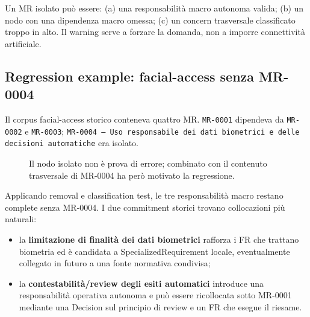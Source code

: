 \documentclass[12pt,a4paper,oneside]{report}
\begin{document}
\begin{resultnote}
Un MR isolato può essere: (a) una responsabilità macro autonoma valida; (b) un nodo con una dipendenza macro omessa; (c) un concern trasversale classificato troppo in alto. Il warning serve a forzare la domanda, non a imporre connettività artificiale.
\end{resultnote}

\subsection{Regression example: facial-access senza MR-0004}

Il corpus facial-access storico conteneva quattro MR. \texttt{MR-0001} dipendeva da \texttt{MR-0002} e \texttt{MR-0003}; \texttt{MR-0004 -- Uso responsabile dei dati biometrici e delle decisioni automatiche} era isolato.

\begin{figure}[H]
\centering
{}
\caption{Il nodo isolato non è prova di errore; combinato con il contenuto trasversale di MR-0004 ha però motivato la regressione.}
\end{figure}

Applicando removal e classification test, le tre responsabilità macro restano complete senza MR-0004. I due commitment storici trovano collocazioni più naturali:
\begin{itemize}
  \item la \textbf{limitazione di finalità dei dati biometrici} rafforza i FR che trattano biometria ed è candidata a SpecializedRequirement locale, eventualmente collegato in futuro a una fonte normativa condivisa;
  \item la \textbf{contestabilità/review degli esiti automatici} introduce una responsabilità operativa autonoma e può essere ricollocata sotto MR-0001 mediante una Decision sul principio di review e un FR che esegue il riesame.
\end{itemize}
\end{document}
